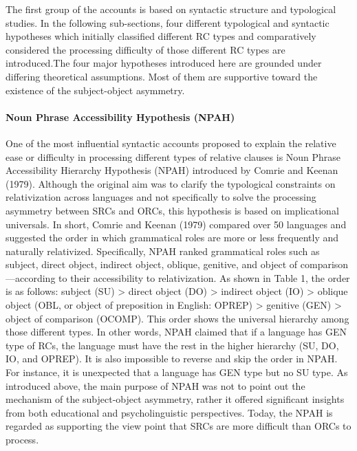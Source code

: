 \documentclass[
]{article}
\begin{document}
The first group of the accounts is based on syntactic structure and
typological studies. In the following sub-sections, four different
typological and syntactic hypotheses which initially classified
different RC types and comparatively considered the processing
difficulty of those different RC types are introduced.The four major
hypotheses introduced here are grounded under differing theoretical
assumptions. Most of them are supportive toward the existence of the
subject-object asymmetry.

\paragraph{Noun Phrase Accessibility Hypothesis
(NPAH)}\label{noun-phrase-accessibility-hypothesis-npah}

One of the most influential syntactic accounts proposed to explain the
relative ease or difficulty in processing different types of relative
clauses is Noun Phrase Accessibility Hierarchy Hypothesis (NPAH)
introduced by Comrie and Keenan (1979). Although the original aim was to
clarify the typological constraints on relativization across languages
and not specifically to solve the processing asymmetry between SRCs and
ORCs, this hypothesis is based on implicational universals. In short,
Comrie and Keenan (1979) compared over 50 languages and suggested the
order in which grammatical roles are more or less frequently and
naturally relativized. Specifically, NPAH ranked grammatical roles such
as subject, direct object, indirect object, oblique, genitive, and
object of comparison---according to their accessibility to
relativization. As shown in Table 1, the order is as follows: subject
(SU) \textgreater{} direct object (DO) \textgreater{} indirect object
(IO) \textgreater{} oblique object (OBL, or object of preposition in
English: OPREP) \textgreater{} genitive (GEN) \textgreater{} object of
comparison (OCOMP). This order shows the universal hierarchy among those
different types. In other words, NPAH claimed that if a language has GEN
type of RCs, the language must have the rest in the higher hierarchy
(SU, DO, IO, and OPREP). It is also impossible to reverse and skip the
order in NPAH. For instance, it is unexpected that a language has GEN
type but no SU type. As introduced above, the main purpose of NPAH was
not to point out the mechanism of the subject-object asymmetry, rather
it offered significant insights from both educational and
psycholinguistic perspectives. Today, the NPAH is regarded as supporting
the view point that SRCs are more difficult than ORCs to process.
\end{document}
